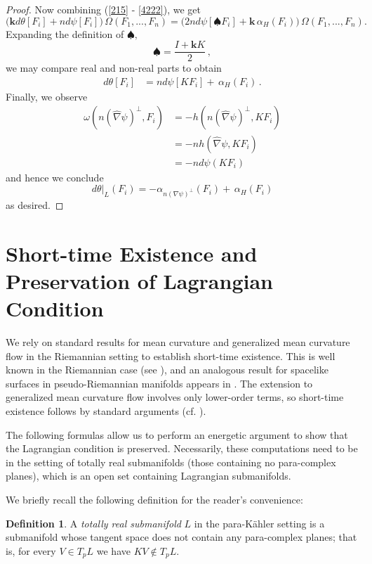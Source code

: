 \documentclass[12pt,letterpaper]{amsart}%
\newcounter{mycounter}
\numberwithin{mycounter}{section}
\theoremstyle{plain}
\numberwithin{equation}{section}
\theoremstyle{definition}
\newtheorem{definition}[mycounter]{Definition}
\begin{document}
\begin{proof}
Now combining (\ref{215} - \ref{4222}), we get 
\[
\Big(  \mathbf{k}d\theta[F_i]+nd\psi[F_i]\Big)\,  \Omega
(F_{1},...,F_{n})=\Big(2nd\psi[\spadesuit F_{i}]+\mathbf{k\,}\alpha_{H}(F_{i})\Big)\,\Omega(F_{1},...,F_{n}).
\]
Expanding the definition of $\spadesuit,$
\[
\spadesuit=\frac{I+\mathbf{k}K}{2}\,,%
\]
we may compare real and non-real parts to obtain
\begin{align*}
d\theta[F_{i}]  &  =nd\psi[KF_{i}]+\mathbf{\,}\alpha_{H}(F_{i})\,.
\end{align*}
Finally, we observe
\begin{align*}
\omega(n(\hat\nabla\psi)  ^{\perp},F_{i})  &  =-h(n(  \hat\nabla
\psi)^{\perp},KF_{i})\\
&  =-nh(\hat\nabla\psi,KF_{i})\\
&=-nd\psi(KF_{i})\,
\end{align*}
and hence we conclude
\[
d\theta|_{L}(F_i)=-\alpha_{n\left(  \nabla\psi\right)  ^{\perp}}(F_i)+\mathbf{\,}%
\alpha_{H}(F_{i})
\]
as desired.
\end{proof}


\section{\label{sect:main}Short-time Existence and Preservation of Lagrangian Condition}



We rely on standard results for mean curvature and generalized mean curvature flow in the Riemannian setting to establish short-time existence. This is well known in the Riemannian case (see \cite[Prop 3.2]{SmoczykSurvey}), and an analogous result for spacelike surfaces in pseudo-Riemannian manifolds appears in \cite[Prop 5.1]{LS}. The extension to generalized mean curvature flow involves only lower-order terms, so short-time existence follows by standard arguments (cf. \cite[Proof of Theorem 1]{SWAsianJMath}).

The following formulas allow us to perform an energetic argument to show that the Lagrangian condition is preserved. Necessarily, these computations need to be in the setting of totally real submanifolds (those containing no para-complex planes), which is an open set containing Lagrangian submanifolds.

We briefly recall the following definition for the reader's convenience: 

\begin{definition}
    A \textit{totally real submanifold} $L$ in the para-K\"{a}hler setting is a submanifold whose tangent space does not contain any para-complex planes; that is, for every $V\in T_{p}L$ we have $KV\notin T_{p}L.$
\end{definition}
\end{document}
